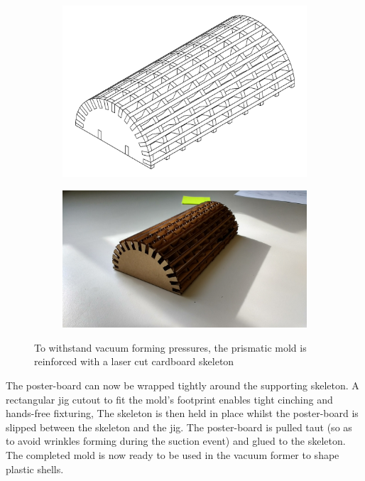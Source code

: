 \documentclass[letterpaper]{report}
\begin{document}
\begin{figure}[ht]
\centering
\begin{subfigure}[t]{0.6\textwidth}
    \centering
    \includegraphics[width=\linewidth]{Mold.png}
\end{subfigure}
\hfill
\begin{subfigure}[t]{0.35\textwidth}
    \centering
    \includegraphics[width=\linewidth]{SupportingSkeleton.jpg}
\end{subfigure}
\caption{\label{fig:ManufactureSkeleton}To withstand vacuum forming pressures, the prismatic mold is reinforced with a laser cut cardboard skeleton}
\end{figure}

The poster-board can now be wrapped tightly around the supporting skeleton.
A rectangular jig cutout to fit the mold's footprint enables tight cinching and hands-free fixturing,
The skeleton is then held in place whilst the poster-board is slipped between the skeleton and the jig.
The poster-board is pulled taut (so as to avoid wrinkles forming during the suction event) and glued to the skeleton.
The completed mold is now ready to be used in the vacuum former to shape plastic shells.
\end{document}
